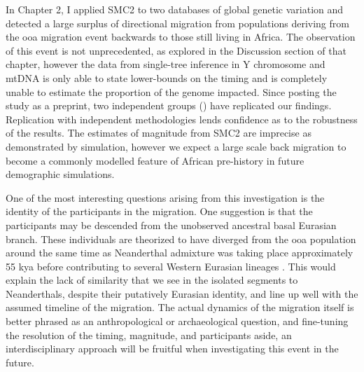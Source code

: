 In Chapter 2, I applied SMC2 to two databases of global genetic variation and detected a large surplus of directional migration from populations deriving from the \gls{ooa} migration event backwards to those still living in Africa. The observation of this event is not unprecedented, as explored in the Discussion section of that chapter, however the data from single-tree inference in Y chromosome and \gls{mtDNA} is only able to state lower-bounds on the timing and is completely unable to estimate the proportion of the genome impacted. Since posting the study as a preprint, two independent groups (\textcite{Montinaro2020,Wang2021}) have replicated our findings. Replication with independent methodologies lends confidence as to the robustness of the results. The estimates of magnitude from SMC2 are imprecise as demonstrated by simulation, however we expect a large scale back migration to become a commonly modelled feature of African pre-history in future demographic simulations. 

One of the most interesting questions arising from this investigation is the identity of the participants in the migration. One suggestion is that the participants may be descended from the unobserved ancestral basal Eurasian branch. These individuals are theorized to have diverged from the \gls{ooa} population around the same time as Neanderthal admixture was taking place approximately 55 kya before contributing to several Western Eurasian lineages \cite{Lazaridis2016,Lazaridis2018}. This would explain the lack of similarity that we see in the isolated segments to Neanderthals, despite their putatively Eurasian identity, and line up well with the assumed timeline of the migration. The actual dynamics of the migration itself is better phrased as an anthropological or archaeological question, and fine-tuning the resolution of the timing, magnitude, and participants aside, an interdisciplinary approach will be fruitful when investigating this event in the future.


